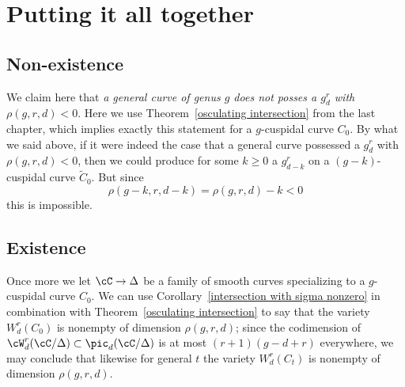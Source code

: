 \section{Putting it all together}

\subsection{Non-existence}

We claim here that \emph{a general curve of genus $g$ does not posses a $g^r_d$ with $\rho(g,r,d) < 0$}.
Here we use Theorem~\ref{osculating intersection} from the last chapter, which implies exactly this statement for a $g$-cuspidal curve $C_0$. By what we said above, if it were indeed the case that a general curve possessed a $g^r_d$ with $\rho(g,r,d) < 0$, then we could produce for some $k \geq 0$ a $g^r_{d-k}$ on a $(g-k)$-cuspidal curve  $\widetilde C_0$. But since
$$
\rho(g-k, r, d-k) = \rho(g,r,d) - k < 0
$$
this is impossible.

\subsection{Existence}

Once more we let $\cC \to \Delta$ be a family of smooth curves specializing to a $g$-cuspidal curve $C_0$. We can use Corollary~\ref{intersection with sigma nonzero} in combination with Theorem~\ref{osculating intersection} to say that the variety $W^r_d(C_0)$ is nonempty of dimension $\rho(g,r,d)$; since the codimension of $\cW^r_d(\cC/\Delta) \subset \pic_d(\cC/\Delta)$ is at most $(r+1)(g-d+r)$ everywhere, we may conclude that likewise for general $t$ the variety $W^r_d(C_t)$ is nonempty of dimension $\rho(g,r,d)$.


